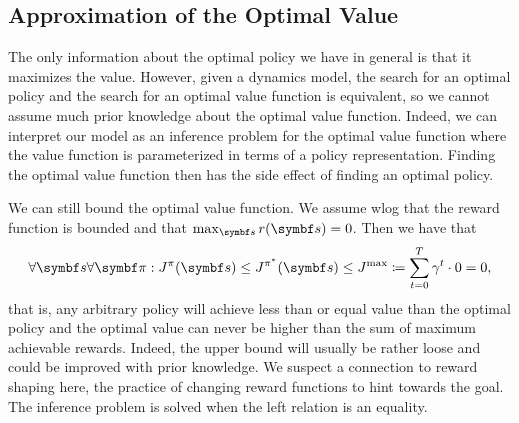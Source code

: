 \subsection{Approximation of the Optimal Value}
The only information about the optimal policy we have in general is that it maximizes the value.
However, given a dynamics model, the search for an optimal policy and the search for an optimal value function is equivalent, so we cannot assume much prior knowledge about the optimal value function.
Indeed, we can interpret our model as an inference problem for the optimal value function where the value function is parameterized in terms of a policy representation.
Finding the optimal value function then has the side effect of finding an optimal policy.

We can still bound the optimal value function.
We assume wlog that the reward function is bounded and that $\max_{\mat{s}} r(\mat{s}) = 0$.
Then we have that
\begin{align}
    \label{eq:inequality_chain}
    \forall \mat{s} \forall \mat{\pi} : J^\pi(\mat{s}) \leq J^{\pi^\ast}(\mat{s}) \leq J^\text{max} \coloneqq \sum_{t=0}^T \gamma^t \cdot 0 = 0,
\end{align}
that is, any arbitrary policy will achieve less than or equal value than the optimal policy and the optimal value can never be higher than the sum of maximum achievable rewards.
Indeed, the upper bound will usually be rather loose and could be improved with prior knowledge.
We suspect a connection to reward shaping here, the practice of changing reward functions to hint towards the goal.
The inference problem is solved when the left relation is an equality.


